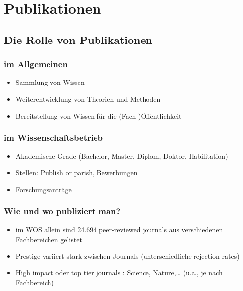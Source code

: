 \documentclass[
]{book}
\providecommand{\tightlist}{%
  \setlength{\itemsep}{0pt}\setlength{\parskip}{0pt}}
\begin{document}
\hypertarget{publikationen}{%
\section{Publikationen}\label{publikationen}}

\hypertarget{die-rolle-von-publikationen}{%
\subsection{Die Rolle von Publikationen}\label{die-rolle-von-publikationen}}

\hypertarget{im-allgemeinen}{%
\subsubsection{im Allgemeinen}\label{im-allgemeinen}}

\begin{itemize}
\tightlist
\item
  Sammlung von Wissen
\item
  Weiterentwicklung von Theorien und Methoden
\item
  Bereitstellung von Wissen für die (Fach-)Öffentlichkeit
\end{itemize}

\hypertarget{im-wissenschaftsbetrieb}{%
\subsubsection{im Wissenschaftsbetrieb}\label{im-wissenschaftsbetrieb}}

\begin{itemize}
\tightlist
\item
  Akademische Grade (Bachelor, Master, Diplom, Doktor, Habilitation)
\item
  Stellen: Publish or parish, Bewerbungen
\item
  Forschungsanträge
\end{itemize}

\hypertarget{wie-und-wo-publiziert-man}{%
\subsubsection{Wie und wo publiziert man?}\label{wie-und-wo-publiziert-man}}

\begin{itemize}
\tightlist
\item
  im WOS allein sind 24.694 peer-reviewed journals aus verschiedenen Fachbereichen gelistet
\item
  Prestige variiert stark zwischen Journals (unterschiedliche rejection rates)
\item
  High impact oder top tier journals : Science, Nature,\ldots{} (u.a., je nach Fachbereich)
\end{itemize}
\end{document}
